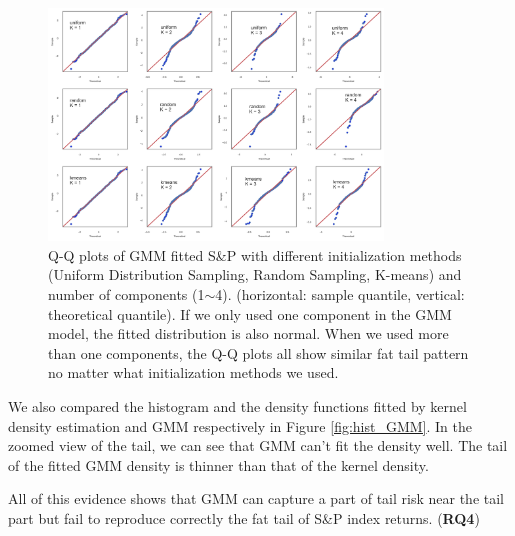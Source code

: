 \documentclass[10pt,journal,compsoc]{IEEEtran}
\begin{document}
         \begin{figure}[h]
        \centering
        \includegraphics[width=3.5in]{figures/qqplot.png}
        \caption{Q-Q plots of GMM fitted S\&P with different initialization methods (Uniform Distribution Sampling, Random Sampling, K-means) and number of components (1$\sim$4). (horizontal: sample quantile, vertical: theoretical quantile). If we only used one component in the GMM model, the fitted distribution is also normal. When we used more than one components, the Q-Q plots all show similar fat tail pattern no matter what initialization methods we used.}
        \label{fig:qqplot}
    \end{figure}
    
    
    We also compared the histogram and the density functions fitted by kernel density estimation and GMM respectively in Figure \ref{fig:hist_GMM}. In the zoomed view of the tail, we can see that GMM can't fit the density well. The tail of the fitted GMM density is thinner than that of the kernel density.
    
    All of this evidence shows that GMM can capture a part of tail risk near the tail part but fail to reproduce correctly the fat tail of S\&P index returns. (\textbf{RQ4}) 
    
    

    
\end{document}

